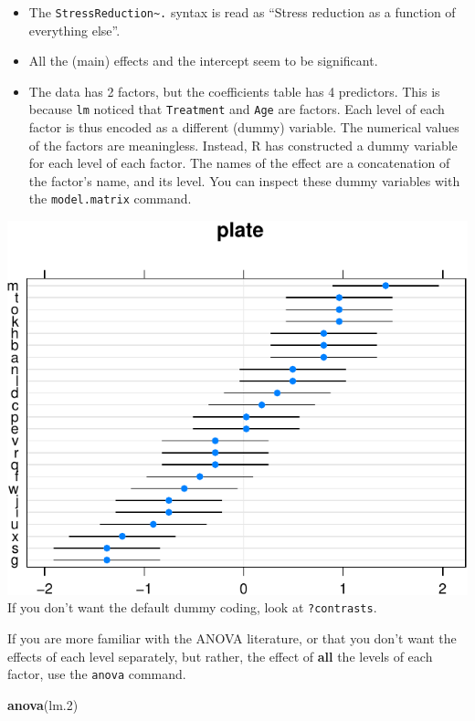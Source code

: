 \documentclass[]{book}
\newenvironment{Shaded}{\begin{snugshade}}{\end{snugshade}}
\newcommand{\KeywordTok}[1]{\textcolor[rgb]{0.13,0.29,0.53}{\textbf{#1}}}
\newcommand{\DecValTok}[1]{\textcolor[rgb]{0.00,0.00,0.81}{#1}}
\newcommand{\StringTok}[1]{\textcolor[rgb]{0.31,0.60,0.02}{#1}}
\newcommand{\OperatorTok}[1]{\textcolor[rgb]{0.81,0.36,0.00}{\textbf{#1}}}
\newcommand{\NormalTok}[1]{#1}
\theoremstyle{definition}
\theoremstyle{definition}
\theoremstyle{definition}
\theoremstyle{remark}
\begin{document}
\begin{itemize}
\item
  The \texttt{StressReduction\textasciitilde{}.} syntax is read as
  ``Stress reduction as a function of everything else''.
\item
  All the (main) effects and the intercept seem to be significant.
\item
  The data has 2 factors, but the coefficients table has 4 predictors.
  This is because \texttt{lm} noticed that \texttt{Treatment} and
  \texttt{Age} are factors. Each level of each factor is thus encoded as
  a different (dummy) variable. The numerical values of the factors are
  meaningless. Instead, R has constructed a dummy variable for each
  level of each factor. The names of the effect are a concatenation of
  the factor's name, and its level. You can inspect these dummy
  variables with the \texttt{model.matrix} command.
\end{itemize}

\begin{Shaded}
\end{Shaded}

\includegraphics[width=0.5\linewidth]{Rcourse_files/figure-latex/unnamed-chunk-155-1}
If you don't want the default dummy coding, look at \texttt{?contrasts}.

If you are more familiar with the ANOVA literature, or that you don't
want the effects of each level separately, but rather, the effect of
\textbf{all} the levels of each factor, use the \texttt{anova} command.

\begin{Shaded}
\begin{Highlighting}[]
\KeywordTok{anova}\NormalTok{(lm.}\DecValTok{2}\NormalTok{)}
\end{Highlighting}
\end{Shaded}
\end{document}
